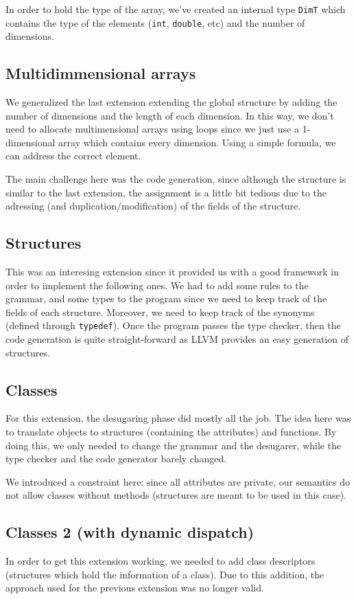\documentclass{article}
\begin{document}
In order to hold the type of the array, we've created an internal type \texttt{DimT} which contains the type of the elements (\texttt{int}, \texttt{double}, etc) and the number of dimensions. 

\subsection{Multidimmensional arrays}


We generalized the last extension extending the global structure by adding the number of dimensions and the length of each dimension. In this way, we don't need to allocate multimensional arrays using loops since we just use a 1-dimensional array which contains every dimension. Using a simple formula, we can address the correct element.

    The main challenge here was the code generation, since although the structure is similar to the last extension, the assignment is a little bit tedious due to the adressing (and duplication/modification) of the fields of the structure. 
\subsection{Structures}

This was an interesing extension since it provided us with a good framework in order to implement the following ones. We had to add some rules to the grammar, and some types to the program since we need to keep track of the fields of each structure. Moreover, we need to keep track of the synonyms (defined through \texttt{typedef}). Once the program passes the type checker, then the code generation is quite straight-forward as LLVM provides an easy generation of structures.


\subsection{Classes}
For this extension, the desugaring phase did mostly all the job. The idea here was to translate objects to structures (containing the attributes) and functions. By doing this, we only needed to change the grammar and the desugarer, while the type checker and the code generator barely changed.

We introduced a constraint here: since all attributes are private, our semantics do not allow classes without methods (structures are meant to be used in this case).

\subsection{Classes 2 (with dynamic dispatch)}
In order to get this extension working, we needed to add class descriptors (structures which hold the information of a class). Due to this addition, the approach used for the previous extension was no longer valid.
\end{document}
